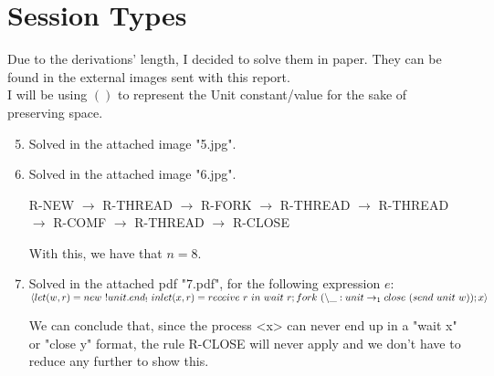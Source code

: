 \documentclass[a4paper]{article}
\begin{document}
\section{Session Types}
Due to the derivations' length, I decided to solve them in paper. They can be found in the external images sent with this report.
\\I will be using $()$ to represent the Unit constant/value for the sake of preserving space.
\begin{enumerate}
  \setcounter{enumi}{4}
  \item Solved in the attached image "5.jpg".
  \item Solved in the attached image "6.jpg".

  R-NEW $\rightarrow$ R-THREAD $\rightarrow$ R-FORK $\rightarrow$ R-THREAD $\rightarrow$ R-THREAD $\rightarrow$ R-COMF $\rightarrow$ R-THREAD $\rightarrow$ R-CLOSE

  With this, we have that $n = 8$.
  \item Solved in the attached pdf "7.pdf", for the following expression $e$:
  \\$\langle let (w, r) = new \ !unit.end_! \ in
  \\let (x, r) = receive \ r \ in \ wait \ r;
  \\fork \ (\backslash\_:unit \rightarrow_1 close \ (send \ unit \ w));
  \\x\rangle$

  We can conclude that, since the process <x> can never end up in a "wait x" or "close y" format, the rule R-CLOSE will never apply and we don't have to reduce any further to show this.
\end{enumerate}
\end{document}
